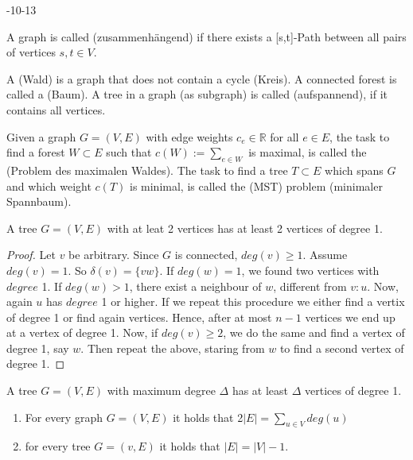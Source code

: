 
\setcounter{lecture}{1}
\setcounter{section}{2}

-10-13


\begin{defn}[connected]
A graph is called  (zusammenhängend) if there exists a [s,t]-Path between all pairs of vertices $s,t \in V$.
\end{defn}

\begin{defn}
A  (Wald) is a graph that does not contain a cycle (Kreis). A connected forest is called a  (Baum). A tree in a graph (as subgraph) is called  (aufspannend), if it contains all vertices.

Given a graph $G=(V,E)$ with edge weights $c_e \in \mathbb{R}$ for all $e \in E$, the task to find a forest $W \subset E$ such that $c(W):=\sum\limits_{e\in W} $ is maximal, is called the  (Problem des maximalen Waldes). 
The task to find a tree $T\subset E$ which spans $G$ and which weight $c(T)$ is minimal, is called the  (MST) problem (minimaler Spannbaum).
\end{defn}

\begin{lem}
A tree $G=(V,E)$ with at leat 2 vertices has at least 2 vertices of degree 1.
\end{lem}
\begin{proof}
Let $v$ be arbitrary. Since $G$ is connected, $deg(v) \geq 1$. Assume $deg(v)=1$. So $\delta(v)=\{vw\}$. If $deg(w)=1$, we found two vertices with $degree$ 1. If $deg(w)>1$, there exist a neighbour of $w$, different from $v:u$. Now, again $u$ has $degree$ 1 or higher. If we repeat this procedure we either find a vertix of degree 1 or find again  vertices. Hence, after at most $n-1$ vertices we end up at a vertex of degree 1. 
Now, if $deg(v) \geq 2$, we do the same and find a vertex of degree 1, say $w$. Then repeat the above, staring from $w$ to find a second vertex of degree 1.
\end{proof}

\begin{cor}
A tree $G=(V,E)$ with maximum degree $\Delta$ has at least $\Delta$ vertices of degree 1.
\end{cor}

\begin{lem}
	\begin{enumerate}
	\item For every graph $G=(V,E)$ it holds that 2$|E|=\sum\limits_{u \in V} deg(u)$
	\item for every tree $G=(v,E)$ it holds that $|E|=|V|-1$.
	\end{enumerate}
	\end{lem}

